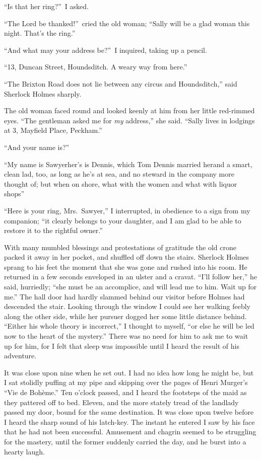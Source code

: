 \documentclass[12pt,english]{book}
\begin{document}
{}``Is that her ring?''\ I asked.

{}``The Lord be thanked!''\ cried the old woman; {}``Sally will
be a glad woman this night. That's the ring.''

{}``And what may your address be?''\ I inquired, taking up a pencil.

{}``13, Duncan Street, Houndsditch. A weary way from here.''

{}``The Brixton Road does not lie between any circus and Houndsditch,''
said Sherlock Holmes sharply.

The old woman faced round and looked keenly at him from her little
red-rimmed eyes. {}``The gentleman asked me for \textit{my} address,''
she said. {}``Sally lives in lodgings at 3, Mayfield Place, Peckham.''

{}``And your name is\mdsh{---}?''

{}``My name is Sawyer\mdsh{---}her's is Dennis, which Tom Dennis
married her\mdsh{---}and a smart, clean lad, too, as long as he's
at sea, and no steward in the company more thought of; but when on
shore, what with the women and what with liquor shops\mdsh{---}''

{}``Here is your ring, Mrs.\ Sawyer,'' I interrupted, in obedience
to a sign from my companion; {}``it clearly belongs to your daughter,
and I am glad to be able to restore it to the rightful owner.''

With many mumbled blessings and protestations of gratitude the old
crone packed it away in her pocket, and shuffled off down the stairs.
Sherlock Holmes sprang to his feet the moment that she was gone and
rushed into his room. He returned in a few seconds enveloped in an
ulster and a cravat. {}``I'll follow her,'' he said, hurriedly;
{}``she must be an accomplice, and will lead me to him. Wait up for
me.'' The hall door had hardly slammed behind our visitor before
Holmes had descended the stair. Looking through the window I could
see her walking feebly along the other side, while her pursuer dogged
her some little distance behind. {}``Either his whole theory is incorrect,''
I thought to myself, {}``or else he will be led now to the heart
of the mystery.'' There was no need for him to ask me to wait up
for him, for I felt that sleep was impossible until I heard the result
of his adventure.

It was close upon nine when he set out. I had no idea how long he
might be, but I sat stolidly puffing at my pipe and skipping over
the pages of Henri Murger's {}``Vie de Boh\`{e}me.'' Ten o'clock passed,
and I heard the footsteps of the maid as they pattered off to bed.
Eleven, and the more stately tread of the landlady passed my door,
bound for the same destination. It was close upon twelve before I
heard the sharp sound of his latch-key. The instant he entered I saw
by his face that he had not been successful. Amusement and chagrin
seemed to be struggling for the mastery, until the former suddenly
carried the day, and he burst into a hearty laugh.
\end{document}
